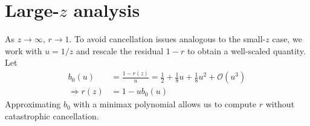 \documentclass{article}
\begin{document}


\section{Large-$z$ analysis}

As $z \to \infty$, $r \to 1$.
To avoid cancellation issues analogous to the small-$z$ case, we work with $u=1/z$ and rescale the residual $1-r$ to obtain a well-scaled quantity.
Let
%
\begin{align}
  b_0(u)           & = \frac{1-r(z)}{u} = \frac{1}{2} + \frac{1}{8} u + \frac{1}{8} u^2 + \mathcal{O}(u^3) \\
  \Rightarrow r(z) & = 1 - u b_0(u) \label{eq:r-large-reparametrized}
\end{align}
%
Approximating $b_0$ with a minimax polynomial allows us to compute $r$ without catastrophic cancellation.
\end{document}
